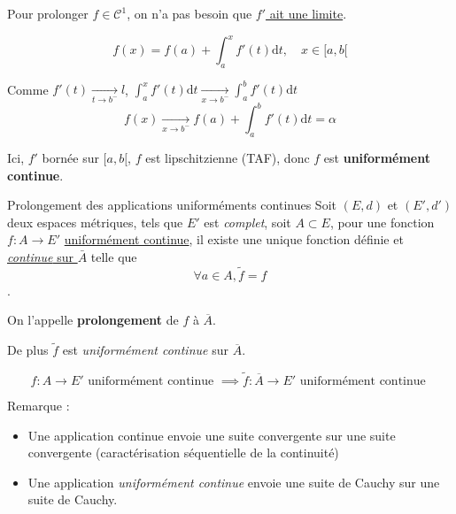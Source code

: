 \begin{note}{}{}
Pour prolonger $f \in \mathcal{C} ^{1}$, on n'a pas besoin que \underline{$f'$ ait une limite}. 
\end{note}

\[
  f(x) = f(a) + \int_{a }^{x } f'(t) \mathrm{d} t, \quad x \in [a, b[
\]

Comme $f'(t)  \underset{ t \to b ^{- }}{\longrightarrow} l$, $\int_{a }^{x } f'(t) \mathrm{d} t  \underset{x \to b ^{- }}{\longrightarrow} \int_{a }^{b } f'(t) \mathrm{d}t$
\[
  f(x)  \underset{ x \to b ^{-}}{\longrightarrow} f(a) + \int_{a }^{b } f'(t) \mathrm{d} t = \alpha
\]

Ici, $f'$ bornée sur $[a, b[$, $f$ est lipschitzienne (TAF), donc $f$ est \textbf{uniformément continue}. 

\begin{Theorem}{Prolongement des applications uniforméments continues}{}
  Soit $(E, d)$ et $(E', d')$ deux espaces métriques, tels que $E'$ est \textit{complet}, soit $A \subset E$, pour une fonction $f : A \to E'$ \underline{uniformément continue}, il existe une unique fonction définie et \underline{\textit{continue} sur $\bar{A}$} telle que $$\forall a \in A, \widetilde{f} = f$$. 

  On l'appelle \textbf{prolongement} de $f$ à $\overline{A}$. 

  De plus $\widetilde{f}$ est \textit{uniformément continue} sur $\overline{A}$.
  
\[
  f: A \to E' \text{ uniformément continue } \implies \widetilde{f} : \overline{A} \to E' \text{ uniformément continue }
\]
\end{Theorem}


Remarque : 
\begin{itemize}

    \item Une application continue envoie une suite convergente sur une suite convergente (caractérisation séquentielle de la continuité)

    \item Une application \textit{uniformément continue} envoie une suite de Cauchy sur une suite de Cauchy.

\end{itemize}

